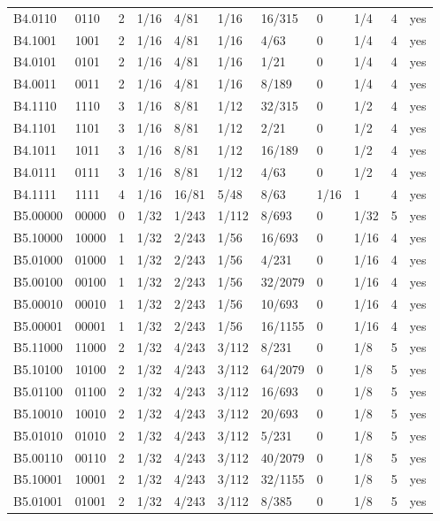 {\begin{longtable}{@{}lllllllllll@{}}
B4.0110 & 0110 & 2 & 1/16 & 4/81 & 1/16 & 16/315 & 0 & 1/4 & 4 & yes \\
B4.1001 & 1001 & 2 & 1/16 & 4/81 & 1/16 & 4/63 & 0 & 1/4 & 4 & yes \\
B4.0101 & 0101 & 2 & 1/16 & 4/81 & 1/16 & 1/21 & 0 & 1/4 & 4 & yes \\
B4.0011 & 0011 & 2 & 1/16 & 4/81 & 1/16 & 8/189 & 0 & 1/4 & 4 & yes \\
B4.1110 & 1110 & 3 & 1/16 & 8/81 & 1/12 & 32/315 & 0 & 1/2 & 4 & yes \\
B4.1101 & 1101 & 3 & 1/16 & 8/81 & 1/12 & 2/21 & 0 & 1/2 & 4 & yes \\
B4.1011 & 1011 & 3 & 1/16 & 8/81 & 1/12 & 16/189 & 0 & 1/2 & 4 & yes \\
B4.0111 & 0111 & 3 & 1/16 & 8/81 & 1/12 & 4/63 & 0 & 1/2 & 4 & yes \\
B4.1111 & 1111 & 4 & 1/16 & 16/81 & 5/48 & 8/63 & 1/16 & 1 & 4 & yes \\
\midrule
B5.00000 & 00000 & 0 & 1/32 & 1/243 & 1/112 & 8/693 & 0 & 1/32 & 5 & yes \\
B5.10000 & 10000 & 1 & 1/32 & 2/243 & 1/56 & 16/693 & 0 & 1/16 & 4 & yes \\
B5.01000 & 01000 & 1 & 1/32 & 2/243 & 1/56 & 4/231 & 0 & 1/16 & 4 & yes \\
B5.00100 & 00100 & 1 & 1/32 & 2/243 & 1/56 & 32/2079 & 0 & 1/16 & 4 & yes \\
B5.00010 & 00010 & 1 & 1/32 & 2/243 & 1/56 & 10/693 & 0 & 1/16 & 4 & yes \\
B5.00001 & 00001 & 1 & 1/32 & 2/243 & 1/56 & 16/1155 & 0 & 1/16 & 4 & yes \\
B5.11000 & 11000 & 2 & 1/32 & 4/243 & 3/112 & 8/231 & 0 & 1/8 & 5 & yes \\
B5.10100 & 10100 & 2 & 1/32 & 4/243 & 3/112 & 64/2079 & 0 & 1/8 & 5 & yes \\
B5.01100 & 01100 & 2 & 1/32 & 4/243 & 3/112 & 16/693 & 0 & 1/8 & 5 & yes \\
B5.10010 & 10010 & 2 & 1/32 & 4/243 & 3/112 & 20/693 & 0 & 1/8 & 5 & yes \\
B5.01010 & 01010 & 2 & 1/32 & 4/243 & 3/112 & 5/231 & 0 & 1/8 & 5 & yes \\
B5.00110 & 00110 & 2 & 1/32 & 4/243 & 3/112 & 40/2079 & 0 & 1/8 & 5 & yes \\
B5.10001 & 10001 & 2 & 1/32 & 4/243 & 3/112 & 32/1155 & 0 & 1/8 & 5 & yes \\
B5.01001 & 01001 & 2 & 1/32 & 4/243 & 3/112 & 8/385 & 0 & 1/8 & 5 & yes \\

\end{longtable}}
